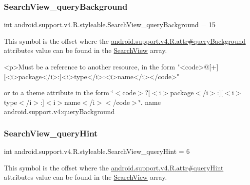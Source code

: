 \subsubsection{\texorpdfstring{Search\+View\+\_\+query\+Background}{SearchView\_queryBackground}}
{\footnotesize\ttfamily int android.\+support.\+v4.\+R.\+styleable.\+Search\+View\+\_\+query\+Background = 15\hspace{0.3cm}{\ttfamily [static]}}

This symbol is the offset where the \hyperlink{classandroid_1_1support_1_1v4_1_1R_1_1attr_abb883f55c9e18decf486d36cde924bbd}{android.\+support.\+v4.\+R.\+attr\#query\+Background} attribute\textquotesingle{}s value can be found in the \hyperlink{classandroid_1_1support_1_1v4_1_1R_1_1styleable_a7f709410d566e9fd5d4c710e815c300a}{Search\+View} array.

\begin{DoxyVerb}      <p>Must be a reference to another resource, in the form "<code>@[+][<i>package</i>:]<i>type</i>:<i>name</i></code>"
\end{DoxyVerb}
 or to a theme attribute in the form \char`\"{}$<$code$>$?\mbox{[}$<$i$>$package$<$/i$>$\+:\mbox{]}\mbox{[}$<$i$>$type$<$/i$>$\+:\mbox{]}$<$i$>$name$<$/i$>$$<$/code$>$\char`\"{}.  name android.\+support.\+v4\+:query\+Background \mbox{\label{classandroid_1_1support_1_1v4_1_1R_1_1styleable_a2094501d783cc294675c58b0b5ef484a}} 
\subsubsection{\texorpdfstring{Search\+View\+\_\+query\+Hint}{SearchView\_queryHint}}
{\footnotesize\ttfamily int android.\+support.\+v4.\+R.\+styleable.\+Search\+View\+\_\+query\+Hint = 6\hspace{0.3cm}{\ttfamily [static]}}

This symbol is the offset where the \hyperlink{classandroid_1_1support_1_1v4_1_1R_1_1attr_a3cf01285970a5ede012ca1d4e7982643}{android.\+support.\+v4.\+R.\+attr\#query\+Hint} attribute\textquotesingle{}s value can be found in the \hyperlink{classandroid_1_1support_1_1v4_1_1R_1_1styleable_a7f709410d566e9fd5d4c710e815c300a}{Search\+View} array.

